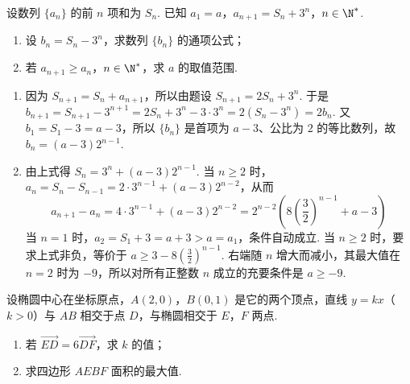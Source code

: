 \begin{problem}
设数列 \(\{a_n\}\) 的前 \(n\) 项和为 \(S_n\). 已知 \(a_1=a\)，\(a_{n+1}=S_n+3^n\)，\(n\in\N^*\).

\begin{enumerate}
\item 设 \(b_n=S_n-3^n\)，求数列 \(\{b_n\}\) 的通项公式；
\item 若 \(a_{n+1}\geqslant a_n\)，\(n\in\N^*\)，求 \(a\) 的取值范围.
\end{enumerate}
\end{problem}

\begin{solution}
\begin{enumerate}
\item 因为 \(S_{n+1}=S_n+a_{n+1}\)，所以由题设 \(S_{n+1}=2S_n+3^n\). 于是 \(b_{n+1}=S_{n+1}-3^{n+1}=2S_n+3^n-3\cdot3^n=2(S_n-3^n)=2b_n\). 又 \(b_1=S_1-3=a-3\)，所以 \(\{b_n\}\) 是首项为 \(a-3\)、公比为 \(2\) 的等比数列，故 \(b_n=(a-3)2^{n-1}\).
\item 由上式得 \(S_n=3^n+(a-3)2^{n-1}\). 当 \(n\geqslant2\) 时，\(a_n=S_n-S_{n-1}=2\cdot3^{n-1}+(a-3)2^{n-2}\)，从而
\[
a_{n+1}-a_n=4\cdot3^{n-1}+(a-3)2^{n-2}=2^{n-2}\left(8\left(\frac32\right)^{n-1}+a-3\right)
\]
当 \(n=1\) 时，\(a_2=S_1+3=a+3>a=a_1\)，条件自动成立. 当 \(n\geqslant2\) 时，要求上式非负，等价于 \(a\geqslant3-8\left(\frac32\right)^{n-1}\). 右端随 \(n\) 增大而减小，其最大值在 \(n=2\) 时为 \(-9\)，所以对所有正整数 \(n\) 成立的充要条件是 \(a\geqslant-9\).
\end{enumerate}
\end{solution}

\begin{problem}
设椭圆中心在坐标原点，\(A(2,0)\)，\(B(0,1)\) 是它的两个顶点，直线 \(y=kx\)（\(k>0\)）与 \(AB\) 相交于点 \(D\)，与椭圆相交于 \(E\)，\(F\) 两点.

\begin{enumerate}
\item 若 \(\overrightarrow{ED}=6\overrightarrow{DF}\)，求 \(k\) 的值；
\item 求四边形 \(AEBF\) 面积的最大值.
\end{enumerate}
\end{problem}

